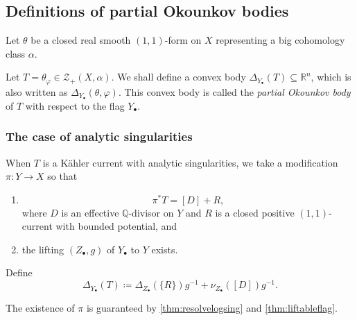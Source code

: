 \subsection{Definitions of partial Okounkov bodies}
\label{subsec:tpob_def}
Let $\theta$ be a closed real smooth $(1,1)$-form on $X$ representing a big cohomology class $\alpha$.

Let $T=\theta_{\varphi}\in \mathcal{Z}_+(X,\alpha)$. We shall define a convex body $\Delta_{Y_{\bullet}}(T)\subseteq \mathbb{R}^n$, which is also written as $\Delta_{Y_{\bullet}}(\theta,\varphi)$. This convex body is called the \emph{partial Okounkov body} of $T$ with respect to the flag $Y_{\bullet}$.

\subsubsection{The case of analytic singularities}
\label{subsubsec:tpob_analytic}

\begin{definition}\label{def:POBanalsing}
    When $T$ is a Kähler current with analytic singularities, we take a modification $\pi\colon Y\rightarrow X$ so that
    \begin{enumerate}
        \item\label{itm:def:POBanalsing:1}
        \begin{equation}\label{eq:resolveanalytic}
            \pi^*T=[D]+R,
        \end{equation}
        where $D$ is an effective $\mathbb{Q}$-divisor on $Y$ and $R$ is a closed positive $(1,1)$-current with bounded potential, and
        \item\label{itm:def:POBanalsing:2} the lifting $(Z_{\bullet},g)$ of $Y_{\bullet}$ to $Y$ exists.
    \end{enumerate}
Define
\begin{equation}\label{eq:POBanalsing}
\Delta_{Y_{\bullet}}(T)\coloneqq\Delta_{Z_{\bullet}}(\{R\})g^{-1}+\nu_{Z_{\bullet}}([D])g^{-1}.
\end{equation}
\end{definition}
The existence of $\pi$ is guaranteed by \cref{thm:resolvelogsing} and \cref{thm:liftableflag}.

